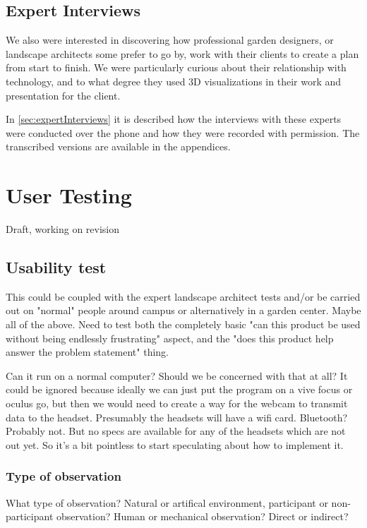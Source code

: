 \subsection{Expert Interviews}
We also were interested in discovering how professional garden designers, or landscape architects some prefer to go by, work with their clients to create a plan from start to finish. We were particularly curious about their relationship with technology, and to what degree they used 3D visualizations in their work and presentation for the client. 

In \autoref{sec:expertInterviews} it is described how the interviews with these experts were conducted over the phone and how they were recorded with permission. The transcribed versions are available in the appendices. 

\section{User Testing}
Draft, working on revision



\subsection{Usability test}
This could be coupled with the expert landscape architect tests and/or be carried out on "normal" people around campus or alternatively in a garden center. Maybe all of the above. Need to test both the completely basic "can this product be used without being endlessly frustrating" aspect, and the "does this product help answer the problem statement" thing.

Can it run on a normal computer? Should we be concerned with that at all? It could be ignored because ideally we can just put the program on a vive focus or oculus go, but then we would need to create a way for the webcam to transmit data to the headset. Presumably the headsets will have a wifi card. Bluetooth? Probably not. But no specs are available for any of the headsets which are not out yet. So it's a bit pointless to start speculating about how to implement it. 

\subsubsection{Type of observation}
What type of observation? Natural or artifical environment, participant or non-participant observation?
Human or mechanical observation? Direct or indirect?

